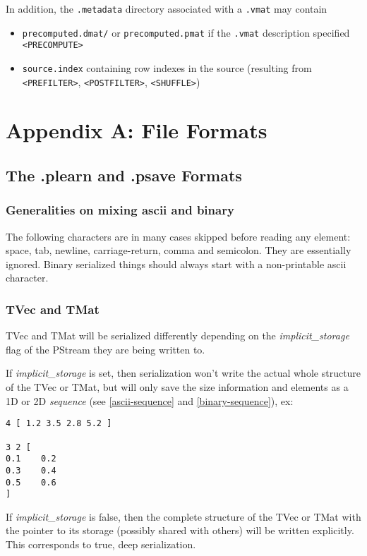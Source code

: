 \documentclass[11pt]{book}
\begin{document}
In addition, the {\tt .metadata} directory associated with a {\tt .vmat} may contain
\begin{itemize}
\item {\tt precomputed.dmat/} or {\tt precomputed.pmat} if the {\tt .vmat} description specified \verb!<PRECOMPUTE>!
\item {\tt source.index} containing row indexes in the source (resulting from \verb!<PREFILTER>!, \verb!<POSTFILTER>!, \verb!<SHUFFLE>!)
\end{itemize}



\chapter{Appendix A: File Formats}

\section{The .plearn and .psave Formats}

\subsection{Generalities on mixing ascii and binary}

The following characters are in many cases skipped before reading any
element: space, tab, newline, carriage-return, comma and semicolon. They
are essentially ignored. Binary serialized things should always start with
a non-printable ascii character.


\subsection{TVec and TMat}

TVec and TMat will be serialized differently depending on the {\em
implicit\_storage} flag of the PStream they are being written to.

If {\em implicit\_storage} is set, then serialization won't write the actual
whole structure of the TVec or TMat, but will only save the size information
and elements as a 1D or 2D {\em sequence} (see \ref{ascii-sequence} and
\ref{binary-sequence}), ex:

\begin{verbatim}
4 [ 1.2 3.5 2.8 5.2 ]

3 2 [
0.1    0.2
0.3    0.4
0.5    0.6
]
\end{verbatim}

If {\em implicit\_storage} is false, then the complete structure of the
TVec or TMat with the pointer to its storage (possibly shared with others)
will be written explicitly. This corresponds to true, deep serialization.
\end{document}
